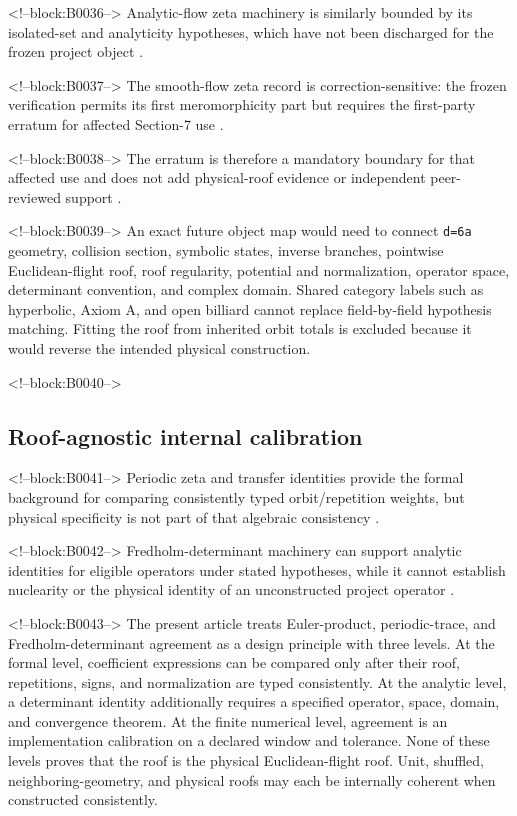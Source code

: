 \documentclass[11pt,a4paper]{article}
\begin{document}
<!--block:B0036-->
Analytic-flow zeta machinery is similarly bounded by its isolated-set and analyticity hypotheses, which have not been discharged for the frozen project object
\citep{P30-S16}.

<!--block:B0037-->
The smooth-flow zeta record is correction-sensitive: the frozen verification permits its first meromorphicity part but requires the first-party erratum for affected Section-7 use
\citep{P30-S17}.

<!--block:B0038-->
The erratum is therefore a mandatory boundary for that affected use and does not add physical-roof evidence or independent peer-reviewed support
\citep{P30-S18}.

<!--block:B0039-->
An exact future object map would need to connect \texttt{d=6a} geometry, collision section, symbolic states, inverse branches, pointwise Euclidean-flight roof, roof regularity, potential and normalization, operator space, determinant convention, and complex domain. Shared category labels such as hyperbolic, Axiom A, and open billiard cannot replace field-by-field hypothesis matching. Fitting the roof from inherited orbit totals is excluded because it would reverse the intended physical construction.

<!--block:B0040-->
\subsection{Roof-agnostic internal calibration}

<!--block:B0041-->
Periodic zeta and transfer identities provide the formal background for comparing consistently typed orbit/repetition weights, but physical specificity is not part of that algebraic consistency
\citep{P30-S13}.

<!--block:B0042-->
Fredholm-determinant machinery can support analytic identities for eligible operators under stated hypotheses, while it cannot establish nuclearity or the physical identity of an unconstructed project operator
\citep{P30-S14}.

<!--block:B0043-->
The present article treats Euler-product, periodic-trace, and Fredholm-determinant agreement as a design principle with three levels. At the formal level, coefficient expressions can be compared only after their roof, repetitions, signs, and normalization are typed consistently. At the analytic level, a determinant identity additionally requires a specified operator, space, domain, and convergence theorem. At the finite numerical level, agreement is an implementation calibration on a declared window and tolerance. None of these levels proves that the roof is the physical Euclidean-flight roof. Unit, shuffled, neighboring-geometry, and physical roofs may each be internally coherent when constructed consistently.
\end{document}
